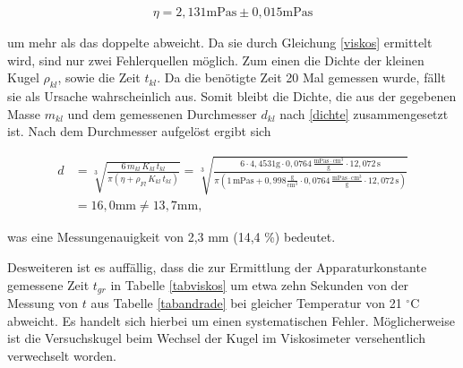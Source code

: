 \begin{align*}
 \eta = 2,131 \text{mPas} \pm 0,015 \text{mPas}
\end{align*}

um mehr als das doppelte abweicht. Da sie durch Gleichung \eqref{viskos} ermittelt wird, sind nur zwei Fehlerquellen möglich. Zum einen
die Dichte der kleinen Kugel $\rho_{kl}$, sowie die Zeit $t_{kl}$. Da die benötigte Zeit 20 Mal gemessen wurde, fällt sie als Ursache
wahrscheinlich aus. Somit bleibt die Dichte, die aus der gegebenen Masse $m_{kl}$ und dem gemessenen Durchmesser $d_{kl}$ nach \eqref{dichte}
zusammengesetzt ist. Nach dem Durchmesser aufgelöst ergibt sich

\begin{align}
  \nonumber
  d &= \sqrt[3]{\frac{6\, m_{kl} \, K_{kl} \, t_{kl} }{\pi \left(\eta + \rho_{Fl} \, K_{kl} \, t_{kl}\right)}} = \sqrt[3]{\frac{6\cdot 4,4531 \text{g} \cdot 0,0764 \,\frac{\text{mPas}\cdot \text{cm}^3}{\text{g}} \cdot 12,072 \,\text{s} }{\pi \left(1\,\text{mPas} + 0,998  \frac{\text{g}}{\text{cm}^3} \cdot 0,0764 \,\frac{\text{mPas}\cdot \text{cm}^3}{\text{g}} \cdot 12,072 \,\text{s}\right)}}\\
  &= 16,0 \text{mm} \neq 13,7 \text{mm},
\end{align}

was eine Messungenauigkeit von 2,3 mm (14,4 \%) bedeutet.

Desweiteren ist es auffällig, dass die zur Ermittlung der Apparaturkonstante gemessene Zeit $t_{gr}$ in Tabelle \ref{tabviskos} um etwa zehn 
Sekunden von der Messung von $t$ aus Tabelle \ref{tabandrade} bei gleicher Temperatur von 21 $^\circ$C abweicht. 
Es handelt sich hierbei um einen systematischen Fehler. Möglicherweise ist die Versuchskugel beim Wechsel der Kugel im Viskosimeter 
versehentlich verwechselt worden.






